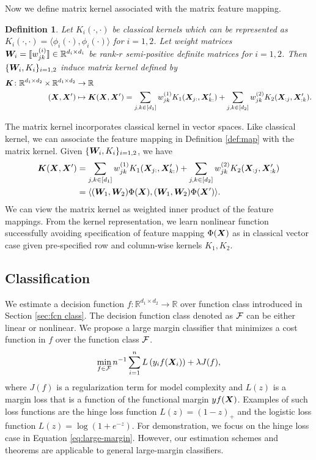 \documentclass[12pt]{article}
\newtheorem{defn}{Definition}
\begin{document}
Now we define matrix kernel associated with the matrix feature mapping.
\begin{defn}\label{def:kernel}
Let $K_i(\cdot,\cdot)$ be classical kernels which can be represented as $K_i(\cdot,\cdot) = \langle \phi_i(\cdot),\phi_i(\cdot)\rangle$ for $i=1,2$. Let weight matrices $\bm{W}_i = \llbracket w^{(i)}_{jk} \rrbracket\in\mathbb{R}^{d_i\times d_i}$ be  rank-$r$ semi-positive definite matrices for $i = 1,2$. Then $\{\bm{W}_i,K_i\}_{i=1,2}$  induce matrix kernel defined by
\begin{align}
    \bm K\colon\mathbb{R}^{d_1\times d_2}\times \mathbb{R}^{d_1\times d_2}&\rightarrow \mathbb{R}\\
    (\bm X,\bm X')&\mapsto \bm K(\bm X,\bm X')  = \sum_{j,k\in[d_1]}w^{(1)}_{jk}K_1(\bm X_{j:},\bm X'_{k:})+\sum_{j,k\in[d_2]}w^{(2)}_{jk}K_2(\bm X_{:j},\bm X'_{:k}).
\end{align}
\end{defn}
The matrix kernel incorporates classical kernel in vector spaces. Like classical kernel, we can associate the feature mapping in Definition \ref{def:map} with the matrix kernel. Given $\{\bm{W}_i,K_i\}_{i=1,2}$, we have
\begin{align}\bm K(\bm X,\bm X')& = \sum_{j,k\in[d_1]}w^{(1)}_{jk}K_1(\bm X_{j:},\bm X'_{k:})+\sum_{j,k\in[d_2]}w^{(2)}_{jk}K_2(\bm X_{:j},\bm X'_{:k}) \\
&=\langle (\bm{W}_1,\bm{W}_2)\Phi(\bm X),(\bm{W}_1,\bm{W}_2)\Phi(\bm X')\rangle.
\end{align}
We can view the matrix kernel as weighted inner product of the feature mappings. From the kernel representation, we learn nonlinear function successfully  avoiding specification of feature mapping $\Phi(\bm X)$ as in classical vector case given pre-specified row and column-wise kernels $K_1,K_2$.



\subsection{Classification}
\label{subsec:pb1}
\label{subsec:pb1}
We estimate a decision function $f\colon\mathbb{R}^{d_1\times d_2}\rightarrow \mathbb{R}$ over function class introduced in Section \ref{sec:fcn class}. The decision function class denoted as $\mathcal{F}$ can be either linear or nonlinear. 
We propose a large margin classifier that minimizes a cost function in $f$ over the function class $\mathcal{F}$.
\begin{align}
\label{eq:large-margin}
\min_{f\in\mathcal{F}}n^{-1}\sum_{i=1}^n L\left(y_i f(\bm X_i)\right)+\lambda J(f),
\end{align}
where $J(f)$ is a regularization term for model complexity and $L(z)$ is a margin loss that is a function of the functional margin $yf(\bm X)$. Examples of such loss functions are the hinge loss function $L(z) = (1-z)_+$ and the logistic loss function $L(z) =\log(1+e^{-z})$.  For demonstration, we focus on the hinge loss case in Equation \eqref{eq:large-margin}. However, our estimation schemes and theorems are applicable to general large-margin classifiers.
\end{document}
